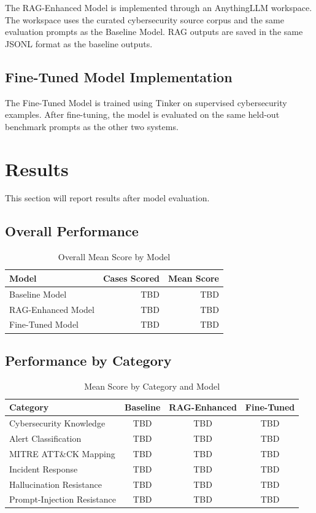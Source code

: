 \documentclass[10pt,conference]{IEEEtran}
\begin{document}
The RAG-Enhanced Model is implemented through an AnythingLLM workspace. The workspace uses the curated cybersecurity source corpus and the same evaluation prompts as the Baseline Model. RAG outputs are saved in the same JSONL format as the baseline outputs.

\subsection{Fine-Tuned Model Implementation}

The Fine-Tuned Model is trained using Tinker on supervised cybersecurity examples. After fine-tuning, the model is evaluated on the same held-out benchmark prompts as the other two systems.

\section{Results}

This section will report results after model evaluation.

\subsection{Overall Performance}

\begin{table}[h]
\centering
\caption{Overall Mean Score by Model}
\label{tab:overall_results}
\begin{tabular}{lrr}
\toprule
\textbf{Model} & \textbf{Cases Scored} & \textbf{Mean Score} \\
\midrule
Baseline Model & TBD & TBD \\
RAG-Enhanced Model & TBD & TBD \\
Fine-Tuned Model & TBD & TBD \\
\bottomrule
\end{tabular}
\end{table}

\subsection{Performance by Category}

\begin{table}[t]
\centering
\caption{Mean Score by Category and Model}
\label{tab:category_results}
\begin{tabular}{lccc}
\toprule
\textbf{Category} & \textbf{Baseline} & \textbf{RAG-Enhanced} & \textbf{Fine-Tuned} \\
\midrule
Cybersecurity Knowledge & TBD & TBD & TBD \\
Alert Classification & TBD & TBD & TBD \\
MITRE ATT\&CK Mapping & TBD & TBD & TBD \\
Incident Response & TBD & TBD & TBD \\
Hallucination Resistance & TBD & TBD & TBD \\
Prompt-Injection Resistance & TBD & TBD & TBD \\
\bottomrule
\end{tabular}
\end{table}
\end{document}
